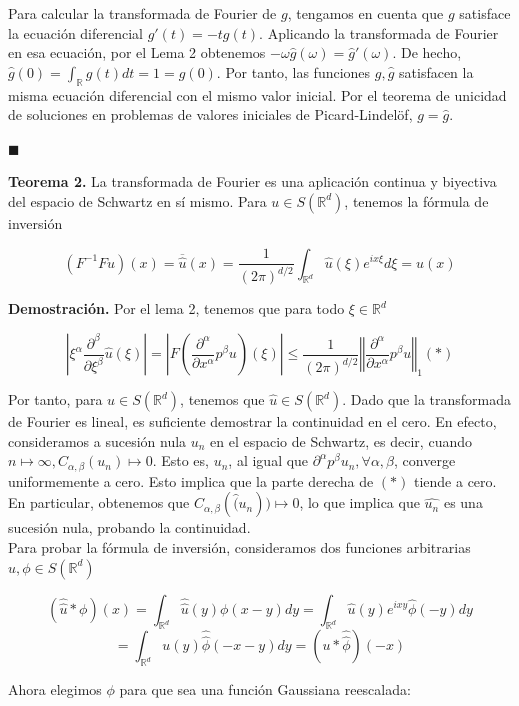 \begin{itemize}
Para calcular la transformada de Fourier de $g$, tengamos en cuenta que $g$ satisface la ecuación diferencial $g'(t) = -t g(t)$. Aplicando la transformada de Fourier en esa ecuación, por el Lema 2 obtenemos $-\omega \hat{g}(\omega) = \hat{g}'(\omega)$. De hecho, $\hat{g}(0) = \int_{\mathbb{R}}g(t) dt = 1 = g(0)$. Por tanto, las funciones $g,\hat{g}$ satisfacen la misma ecuación diferencial con el mismo valor inicial. Por el teorema de unicidad de soluciones en problemas de valores iniciales de Picard-Lindelöf, $g = \hat{g}$.

\hfill$\blacksquare$

\textbf{Teorema 2.} La transformada de Fourier es una aplicación continua y biyectiva del espacio de Schwartz en sí mismo. Para $u \in S(\mathbb{R}^d)$, tenemos la fórmula de inversión

	$$(F^{-1}Fu)(x) = \overline{\hat{u}}(x)= \frac{1}{(2\pi)^{d/2}} \int_{\mathbb{R}^d} \hat{u}(\xi) e^{ix\xi} d\xi = u(x)$$

\textbf{Demostración.} Por el lema 2, tenemos que para todo $\xi \in \mathbb{R}^d$

$$|\xi^\alpha \frac{\partial^\beta}{\partial \xi^\beta}\hat{u}(\xi)| = |F(\frac{\partial^\alpha}{\partial x^\alpha}p^\beta u)(\xi)| \leq \frac{1}{(2\pi)^{d/2}} \left\Vert \frac{\partial^\alpha}{\partial x^\alpha}p^\beta u \right \Vert_1  (*)$$

Por tanto, para $u \in S(\mathbb{R}^d)$, tenemos que $\hat{u} \in S(\mathbb{R}^d)$. Dado que la transformada de Fourier es lineal, es suficiente demostrar la continuidad en el cero. En efecto, consideramos a sucesión nula ${u_n}$ en el espacio de Schwartz, es decir, cuando $n \mapsto \infty, C_{\alpha,\beta}(u_n) \mapsto 0$. Esto es, ${u_n}$, al igual que ${\partial^\alpha p^\beta u_n}, \forall \alpha, \beta$, converge uniformemente a cero. Esto implica que la parte derecha de $(*)$ tiende a cero. En particular, obtenemos que $C_{\alpha,\beta}(\hat(u_n)) \mapsto 0$, lo que implica que ${\hat{u_n}}$ es una sucesión nula, probando la continuidad. \\

Para probar la fórmula de inversión, consideramos dos funciones arbitrarias $u, \phi \in S(\mathbb{R}^d)$

$$(\hat{\hat{u}}*\phi)(x) = \int_{\mathbb{R}^d} \hat{\hat{u}}(y) \phi(x-y) dy = \int_{\mathbb{R}^d}\hat{u}(y) e^{ixy} \hat{\phi}(-y) dy$$
$$ = \int_{\mathbb{R}^d} u(y) \hat{\hat{\phi}}(-x-y)dy = (u*\hat{\hat{\phi}})(-x)$$

Ahora elegimos $\phi$ para que sea una función Gaussiana reescalada:


\end{itemize}
